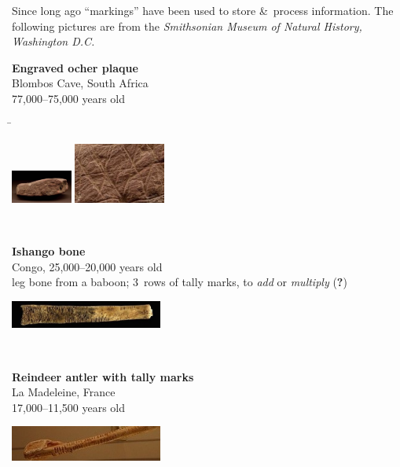 \begin{frame}
Since long ago ``markings'' have been used to store \&\ process information.
The following pictures are from the {\em Smithsonian Museum of Natural
History, Washington D.C.}
\begin{tabbing}
\begin{minipage}{6cm}
\raggedright
{\bf Engraved ocher plaque} \\
Blombos Cave, South Africa \\
77,000--75,000 years old
\end{minipage}
\=\begin{minipage}{6cm}
\includegraphics[width=2cm]{figures/ocher.jpg}
\hskip 2mm
\includegraphics[width=3cm]{figures/ocher-zoom.jpg}
\end{minipage} \\[2mm]
\begin{minipage}{6cm}
\raggedright
{\bf Ishango bone} \\
Congo, 25,000--20,000 years old \\
leg bone from a baboon; 3~rows of tally marks,
to {\em add} or {\em multiply} ({\bf ?})
\end{minipage}
\>\begin{minipage}{5cm}
\includegraphics[width=5cm]{figures/ishango.jpg}
\end{minipage} \\[2mm]
\begin{minipage}{6cm}
\raggedright
{\bf Reindeer antler with tally marks} \\
La Madeleine, France \\
17,000--11,500 years old
\end{minipage}
\>\begin{minipage}{5cm}
\includegraphics[width=5cm]{figures/antler.jpg}
\end{minipage}
\end{tabbing}
\end{frame}

